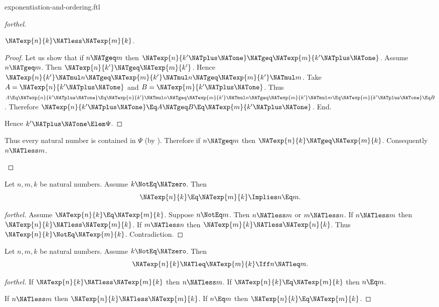 \documentclass{stex}
\begin{document}
\begin{smodule}{exponentiation-and-ordering.ftl}
\begin{proof}[forthel]
\begin{case}{$\NATexp{n}{k} \NATless \NATexp{m}{k}$.}
\begin{proof}
      Let us show that if $n \NATgeq m$ then $\NATexp{n}{k' \NATplus \NATone} \NATgeq \NATexp{m}{k' \NATplus \NATone}$.
        Assume $n \NATgeq m$.
        Then $\NATexp{n}{k'} \NATgeq \NATexp{m}{k'}$.
        Hence $\NATexp{n}{k'} \NATmul n \NATgeq \NATexp{m}{k'} \NATmul n \NATgeq \NATexp{m}{k'} \NATmul m$.
        Take $A = \NATexp{n}{k' \NATplus \NATone}$ and $B = \NATexp{m}{k' \NATplus \NATone}$. %
        Thus $A
          \Eq \NATexp{n}{k' \NATplus \NATone}
          \Eq \NATexp{n}{k'} \NATmul n
          \NATgeq \NATexp{m}{k'} \NATmul n
          \NATgeq \NATexp{m}{k'} \NATmul m
          \Eq \NATexp{m}{k' \NATplus \NATone}
          \Eq B$.
        Therefore $\NATexp{n}{k' \NATplus \NATone} \Eq A \NATgeq B \Eq \NATexp{m}{k' \NATplus \NATone}$.
      End.

      Hence $k' \NATplus \NATone \Elem \Psi$.
    \end{proof}

    Thus every natural number is contained in $\Psi$ (by ).
    Therefore if $n \NATgeq m$ then $\NATexp{n}{k} \NATgeq \NATexp{m}{k}$.
    Consequently $n \NATless m$.
  \end{case}
\end{proof}

\begin{corollary}[forthel]
  Let $n, m, k$ be natural numbers.
  Assume $k \NotEq \NATzero$.
  Then \[ \NATexp{n}{k} \Eq \NATexp{m}{k} \Implies n \Eq m. \]
\end{corollary}
\begin{proof}[forthel]
  Assume $\NATexp{n}{k} \Eq \NATexp{m}{k}$.
  Suppose $n \NotEq m$.
  Then $n \NATless m$ or $m \NATless n$.
  If $n \NATless m$ then $\NATexp{n}{k} \NATless \NATexp{m}{k}$.
  If $m \NATless n$ then $\NATexp{m}{k} \NATless \NATexp{n}{k}$.
  Thus $\NATexp{n}{k} \NotEq \NATexp{m}{k}$.
  Contradiction.
\end{proof}

\begin{corollary}[forthel]
  Let $n, m, k$ be natural numbers.
  Assume $k \NotEq \NATzero$.
  Then \[ \NATexp{n}{k} \NATleq \NATexp{m}{k} \Iff n \NATleq m. \]
\end{corollary}
\begin{proof}[forthel]
  If $\NATexp{n}{k} \NATless \NATexp{m}{k}$ then $n \NATless m$.
  If $\NATexp{n}{k} \Eq \NATexp{m}{k}$ then $n \Eq m$.

  If $n \NATless m$ then $\NATexp{n}{k} \NATless \NATexp{m}{k}$.
  If $n \Eq m$ then $\NATexp{n}{k} \Eq \NATexp{m}{k}$.
\end{proof}


\end{smodule}
\end{document}
